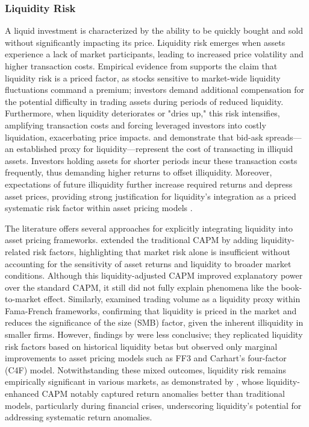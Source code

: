\subsubsection{Liquidity Risk}
A liquid investment is characterized by the ability to be quickly bought and sold without significantly impacting its price. Liquidity risk emerges when assets experience a lack of market participants, leading to increased price volatility and higher transaction costs. Empirical evidence from  supports the claim that liquidity risk is a priced factor, as stocks sensitive to market-wide liquidity fluctuations command a premium; investors demand additional compensation for the potential difficulty in trading assets during periods of reduced liquidity. Furthermore, when liquidity deteriorates or "dries up," this risk intensifies, amplifying transaction costs and forcing leveraged investors into costly liquidation, exacerbating price impacts.  and  demonstrate that bid-ask spreads—an established proxy for liquidity—represent the cost of transacting in illiquid assets. Investors holding assets for shorter periods incur these transaction costs frequently, thus demanding higher returns to offset illiquidity. Moreover, expectations of future illiquidity further increase required returns and depress asset prices, providing strong justification for liquidity's integration as a priced systematic risk factor within asset pricing models \cite{amihud_2002}.

The literature offers several approaches for explicitly integrating liquidity into asset pricing frameworks.  extended the traditional CAPM by adding liquidity-related risk factors, highlighting that market risk alone is insufficient without accounting for the sensitivity of asset returns and liquidity to broader market conditions. Although this liquidity-adjusted CAPM improved explanatory power over the standard CAPM, it still did not fully explain phenomena like the book-to-market effect. Similarly,  examined trading volume as a liquidity proxy within Fama-French frameworks, confirming that liquidity is priced in the market and reduces the significance of the size (SMB) factor, given the inherent illiquidity in smaller firms. However, findings by  were less conclusive; they replicated liquidity risk factors based on historical liquidity betas but observed only marginal improvements to asset pricing models such as FF3 and Carhart's four-factor (C4F) model. Notwithstanding these mixed outcomes, liquidity risk remains empirically significant in various markets, as demonstrated by , whose liquidity-enhanced CAPM notably captured return anomalies better than traditional models, particularly during financial crises, underscoring liquidity’s potential for addressing systematic return anomalies.

